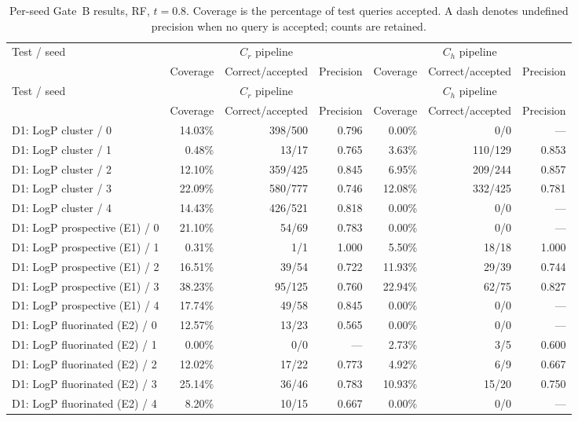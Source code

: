 \begin{longtable}{@{}lrrrrrr@{}}
\caption{Per-seed Gate~B results, RF, $t=0.8$. Coverage is the percentage of test queries accepted. A dash denotes undefined precision when no query is accepted; counts are retained.}\\
\toprule
Test / seed & \multicolumn{3}{c}{$C_r$ pipeline} & \multicolumn{3}{c}{$C_h$ pipeline} \\
 & Coverage & Correct/accepted & Precision & Coverage & Correct/accepted & Precision \\
\midrule
\endfirsthead
\toprule
Test / seed & \multicolumn{3}{c}{$C_r$ pipeline} & \multicolumn{3}{c}{$C_h$ pipeline} \\
 & Coverage & Correct/accepted & Precision & Coverage & Correct/accepted & Precision \\
\midrule
\endhead
\bottomrule
\endfoot
D1: LogP cluster / 0 & 14.03\% & 398/500 & 0.796 & 0.00\% & 0/0 & --- \\
D1: LogP cluster / 1 & 0.48\% & 13/17 & 0.765 & 3.63\% & 110/129 & 0.853 \\
D1: LogP cluster / 2 & 12.10\% & 359/425 & 0.845 & 6.95\% & 209/244 & 0.857 \\
D1: LogP cluster / 3 & 22.09\% & 580/777 & 0.746 & 12.08\% & 332/425 & 0.781 \\
D1: LogP cluster / 4 & 14.43\% & 426/521 & 0.818 & 0.00\% & 0/0 & --- \\
\addlinespace
D1: LogP prospective (E1) / 0 & 21.10\% & 54/69 & 0.783 & 0.00\% & 0/0 & --- \\
D1: LogP prospective (E1) / 1 & 0.31\% & 1/1 & 1.000 & 5.50\% & 18/18 & 1.000 \\
D1: LogP prospective (E1) / 2 & 16.51\% & 39/54 & 0.722 & 11.93\% & 29/39 & 0.744 \\
D1: LogP prospective (E1) / 3 & 38.23\% & 95/125 & 0.760 & 22.94\% & 62/75 & 0.827 \\
D1: LogP prospective (E1) / 4 & 17.74\% & 49/58 & 0.845 & 0.00\% & 0/0 & --- \\
\addlinespace
D1: LogP fluorinated (E2) / 0 & 12.57\% & 13/23 & 0.565 & 0.00\% & 0/0 & --- \\
D1: LogP fluorinated (E2) / 1 & 0.00\% & 0/0 & --- & 2.73\% & 3/5 & 0.600 \\
D1: LogP fluorinated (E2) / 2 & 12.02\% & 17/22 & 0.773 & 4.92\% & 6/9 & 0.667 \\
D1: LogP fluorinated (E2) / 3 & 25.14\% & 36/46 & 0.783 & 10.93\% & 15/20 & 0.750 \\
D1: LogP fluorinated (E2) / 4 & 8.20\% & 10/15 & 0.667 & 0.00\% & 0/0 & --- \\

\end{longtable}
